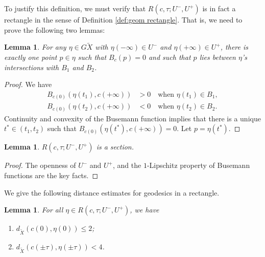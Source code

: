 \documentclass[11pt]{article}
\newtheorem{lem}[thm]{Lemma}
\theoremstyle{definition}
\numberwithin{equation}{section}
\begin{document}
To justify this definition, we must verify that $R(c, \tau; U^-, U^+)$ is in fact a rectangle in the sense of Definition \ref{def:geom rectangle}. That is, we need to prove the following two lemmas:

\begin{lem} \label{sectionproof}
For any $\eta \in G\tilde X$ with $\eta(-\infty) \in U^-$ and $\eta(+\infty) \in U^+$, there is exactly one point $p \in \eta$ such that $B_{c}(p)=0$ and such that $p$ lies between $\eta$'s intersections with $B_1$ and $B_2$.
\end{lem}

\begin{proof}
We have
\begin{align*}
B_{c(0)}(\eta(t_1),c(+\infty))&>0\quad \text{when }\eta(t_1)\in B_1,\\
B_{c(0)}(\eta(t_2),c(+\infty))&<0\quad \text{when }\eta(t_2)\in B_2. 
\end{align*}
Continuity and convexity of the Busemann function implies that there is a unique $t^*\in (t_1, t_2)$ such that $B_{c(0)}(\eta(t^*),c(+\infty))=0$. Let $p=\eta(t^*)$.
\end{proof}
\begin{lem}
$R(c, \tau; U^-, U^+)$ is a section.
\end{lem}
\begin{proof}
The openness of $U^-$ and $U^+$, and the $1$-Lipschitz property of Busemann functions are the key facts.
\end{proof}

We give the following distance estimates for geodesics in a rectangle.

\begin{lem} \label{l.distance}
For all $\eta \in R(c, \tau; U^-, U^+)$, we have
\begin{enumerate}
\item\label{l.distance1} $d_{\tilde X}(c(0), \eta(0))\leq 2$;
\item\label{l.distance2} $d_{\tilde X}(c( \pm \tau), \eta(\pm \tau))<4$.
\end{enumerate}
\end{lem}
\end{document}
